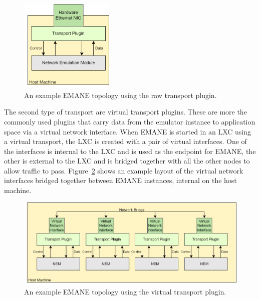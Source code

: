 \begin{figure}[!ht]
    \centering
    \includegraphics[width=0.4\textwidth,keepaspectratio]{Images/Chpt2/RawTransport.png}
    \caption{An example EMANE topology using the raw transport plugin.}
    \label{emane_raw_transport}
\end{figure}

The second type of transport are virtual transport plugins.
These are more the commonly used plugins that carry data from the emulator instance to application space via a virtual network interface.
When EMANE is started in an LXC using a virtual transport, the LXC is created with a pair of virtual interfaces.
One of the interfaces is internal to the LXC and is used as the endpoint for EMANE, the other is external to the LXC and is bridged together with all the other nodes to allow traffic to pass.
Figure~\ref{emane_virtual_transport} shows an example layout of the virtual network interfaces bridged together between EMANE instances, internal on the host machine.

\begin{figure}[!ht]
    \centering
    \includegraphics[width=\textwidth,keepaspectratio]{Images/Chpt2/VirtualTransport.png}
    \caption{An example EMANE topology using the virtual transport plugin.}
    \label{emane_virtual_transport}
\end{figure}

